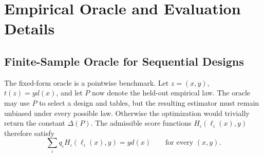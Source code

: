 \section{Empirical Oracle and Evaluation Details}\label{app:emp}
\subsection{Finite-Sample Oracle for Sequential Designs}
The fixed-form oracle is a pointwise benchmark. Let $z=(x,y)$, $t(z)=yd(x)$, and let $P$ now denote the held-out empirical law. The oracle may use $P$ to select a design and tables, but the resulting estimator must remain unbiased under every possible law. Otherwise the optimization would trivially return the constant $\Delta(P)$. The admissible score functions $H_\iota(\ell_\iota(x),y)$ therefore satisfy
\begin{equation}
             \sum_\iota q_\iota H_\iota(\ell_\iota(x),y)=yd(x)\qquad\text{for every }(x,y).\label{eq:unbpoint}
\end{equation}


